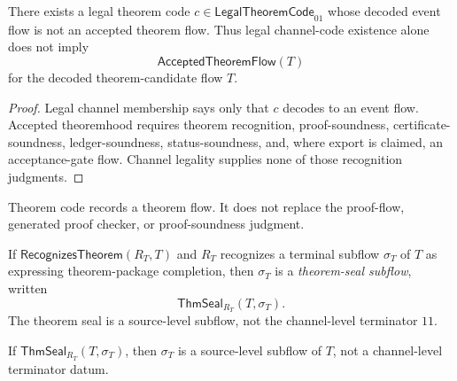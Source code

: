 \begin{proposition}
\label{prop:theorem-generated-code-existence-not-accepted}
There exists a legal theorem code $c\in\mathsf{LegalTheoremCode}_{01}$ whose decoded event flow is not an accepted theorem flow. Thus legal channel-code existence alone does not imply
$$
  \mathsf{AcceptedTheoremFlow}(T)
$$
for the decoded theorem-candidate flow $T$.
\end{proposition}

\begin{proof}
Legal channel membership says only that $c$ decodes to an event flow. Accepted theoremhood requires theorem recognition, proof-soundness, certificate-soundness, ledger-soundness, status-soundness, and, where export is claimed, an acceptance-gate flow. Channel legality supplies none of those recognition judgments.
\end{proof}

\begin{corollary}
\label{cor:theorem-generated-code-is-not-proof}
Theorem code records a theorem flow. It does not replace the proof-flow, generated proof checker, or proof-soundness judgment.
\end{corollary}

\begin{definition}
\label{def:theorem-generated-seal-subflow}
If $\mathsf{RecognizesTheorem}(R_T,T)$ and $R_T$ recognizes a terminal subflow $\sigma_T$ of $T$ as expressing theorem-package completion, then $\sigma_T$ is a \emph{theorem-seal subflow}, written
$$
  \mathsf{ThmSeal}_{R_T}(T,\sigma_T).
$$
The theorem seal is a source-level subflow, not the channel-level terminator $11$.
\end{definition}

\begin{proposition}
\label{prop:theorem-generated-seal-not-channel-terminator}
If $\mathsf{ThmSeal}_{R_T}(T,\sigma_T)$, then $\sigma_T$ is a source-level subflow of $T$, not a channel-level terminator datum.
\end{proposition}

